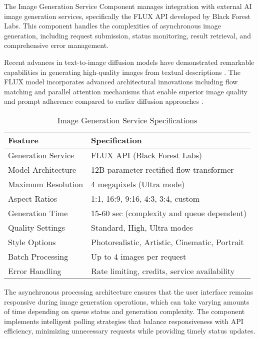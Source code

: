 The Image Generation Service Component manages integration with external AI image generation services, specifically the FLUX API developed by Black Forest Labs. This component handles the complexities of asynchronous image generation, including request submission, status monitoring, result retrieval, and comprehensive error management.

Recent advances in text-to-image diffusion models have demonstrated remarkable capabilities in generating high-quality images from textual descriptions \cite{yang2023text, saharia2022photorealistic}. The FLUX model incorporates advanced architectural innovations including flow matching and parallel attention mechanisms that enable superior image quality and prompt adherence compared to earlier diffusion approaches \cite{liang2024rich}.

\begin{table}[H]
\centering
\small
\caption{Image Generation Service Specifications}
\label{tab:imggen_specifications}
\begin{tabular}{ll}
\toprule
\textbf{Feature} & \textbf{Specification} \\
\midrule
Generation Service & FLUX API (Black Forest Labs) \\
Model Architecture & 12B parameter rectified flow transformer \\
Maximum Resolution & 4 megapixels (Ultra mode) \\
Aspect Ratios & 1:1, 16:9, 9:16, 4:3, 3:4, custom \\
Generation Time & 15-60 sec (complexity and queue dependent) \\
Quality Settings & Standard, High, Ultra modes \\
Style Options & Photorealistic, Artistic, Cinematic, Portrait \\
Batch Processing & Up to 4 images per request \\
Error Handling & Rate limiting, credits, service availability \\
\bottomrule
\end{tabular}
\end{table}

The asynchronous processing architecture ensures that the user interface remains responsive during image generation operations, which can take varying amounts of time depending on queue status and generation complexity. The component implements intelligent polling strategies that balance responsiveness with API efficiency, minimizing unnecessary requests while providing timely status updates.

